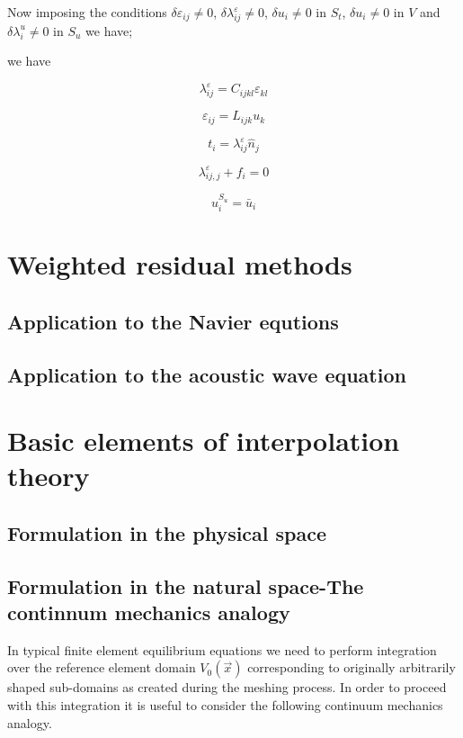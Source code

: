 Now imposing the conditions $\delta {\varepsilon _{ij}} \neq 0$, $\delta \lambda _{ij}^\varepsilon  \neq 0$, $\delta {u_i} \neq 0$ in $S_t$, $\delta {u_i} \neq 0$ in $V$ and $\delta \lambda _i^u \neq 0$ in $S_u$ we have;

we have

\begin{equation}
\lambda _{ij}^\varepsilon  = {C_{ijkl}}{\varepsilon _{kl}}
\end{equation}



\begin{equation}
{\varepsilon _{ij}} = {L_{ijk}}{u_k}
\end{equation}



\begin{equation}
{t_i} = \lambda _{ij}^\varepsilon {{\hat n}_j}
\end{equation}



\begin{equation}
\lambda _{ij,j}^\varepsilon  + {f_i} = 0
\end{equation}



\begin{equation}
u_i^{{S_u}} = {{\bar u}_i}
\end{equation}

\section{Weighted residual methods}
\subsection{Application to the Navier equtions}
\subsection{Application to the acoustic wave equation}

\section{Basic elements of interpolation theory}
\subsection{Formulation in the physical space}
\subsection{Formulation in the natural space-The continnum mechanics analogy}
In typical finite element equilibrium equations we need to perform integration over the reference element domain $V_0(\vec{x})$ corresponding to originally arbitrarily shaped sub-domains as created during the meshing process.  In order to proceed with this integration it is useful to consider the following continuum mechanics analogy.

